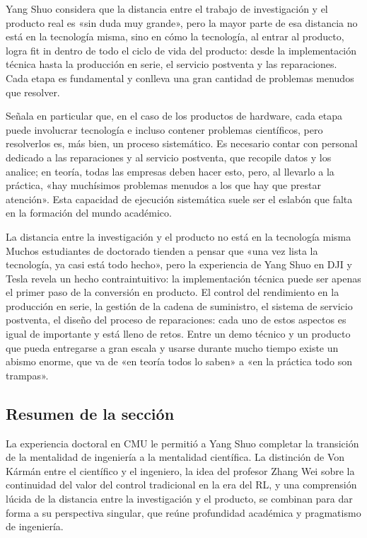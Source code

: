 Yang Shuo considera que la distancia entre el trabajo de investigación y el producto real es «sin duda muy grande», pero la mayor parte de esa distancia no está en la tecnología misma, sino en cómo la tecnología, al entrar al producto, logra fit in dentro de todo el ciclo de vida del producto: desde la implementación técnica hasta la producción en serie, el servicio postventa y las reparaciones. Cada etapa es fundamental y conlleva una gran cantidad de problemas menudos que resolver.

Señala en particular que, en el caso de los productos de hardware, cada etapa puede involucrar tecnología e incluso contener problemas científicos, pero resolverlos es, más bien, un proceso sistemático. Es necesario contar con personal dedicado a las reparaciones y al servicio postventa, que recopile datos y los analice; en teoría, todas las empresas deben hacer esto, pero, al llevarlo a la práctica, «hay muchísimos problemas menudos a los que hay que prestar atención». Esta capacidad de ejecución sistemática suele ser el eslabón que falta en la formación del mundo académico.

\begin{warningbox}{La distancia entre la investigación y el producto no está en la tecnología misma}
Muchos estudiantes de doctorado tienden a pensar que «una vez lista la tecnología, ya casi está todo hecho», pero la experiencia de Yang Shuo en DJI y Tesla revela un hecho contraintuitivo: la implementación técnica puede ser apenas el primer paso de la conversión en producto. El control del rendimiento en la producción en serie, la gestión de la cadena de suministro, el sistema de servicio postventa, el diseño del proceso de reparaciones: cada uno de estos aspectos es igual de importante y está lleno de retos. Entre un demo técnico y un producto que pueda entregarse a gran escala y usarse durante mucho tiempo existe un abismo enorme, que va de «en teoría todos lo saben» a «en la práctica todo son trampas».
\end{warningbox}

\subsection{Resumen de la sección}

La experiencia doctoral en CMU le permitió a Yang Shuo completar la transición de la mentalidad de ingeniería a la mentalidad científica. La distinción de Von Kármán entre el científico y el ingeniero, la idea del profesor Zhang Wei sobre la continuidad del valor del control tradicional en la era del RL, y una comprensión lúcida de la distancia entre la investigación y el producto, se combinan para dar forma a su perspectiva singular, que reúne profundidad académica y pragmatismo de ingeniería.

